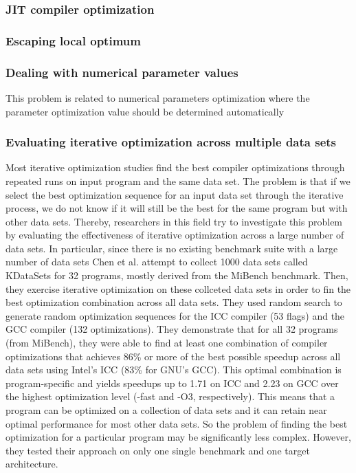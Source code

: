 \subsubsection{JIT compiler optimization}
\subsubsection{Escaping local optimum}
\subsubsection{Dealing with numerical parameter values}
This problem is related to numerical parameters optimization where the parameter optimization value should be determined automatically
\subsubsection{Evaluating iterative optimization across multiple data sets}
Most iterative optimization studies find the best compiler optimizations through repeated runs on input program and the same data set. The problem is that if we select the best optimization sequence for an input data set through the iterative process, we do not know if it will still be the best for the same program but with other data sets. Thereby, researchers in this field try to investigate this problem by evaluating the effectiveness of iterative optimization across a large number of data sets. In particular, since there is no existing benchmark suite with a large number of data sets  Chen et al.\cite{chen2010evaluating} attempt to collect 1000 data sets called KDataSets for 32 programs, mostly derived from the MiBench benchmark. Then, they exercise iterative optimization on these collceted data sets in order to fin the best optimization combination across all data sets. 
They used random search to generate random optimization sequences for the ICC compiler (53 flags) and the GCC compiler (132 optimizations).
They demonstrate that for all 32 programs (from MiBench), they were able to find at least one combination of compiler optimizations that achieves 86\% or more of the best possible speedup across all data sets using Intel’s ICC (83\% for GNU’s GCC). This optimal combination is program-specific and yields speedups up to 1.71 on ICC and 2.23 on GCC over the highest optimization level (-fast and -O3, respectively). This means that a program can be optimized on a collection of data sets and it can retain near optimal performance for most other data sets. So the problem of finding the best optimization for a particular program may be significantly less complex. However, they tested their approach on only one single benchmark and one target architecture.
